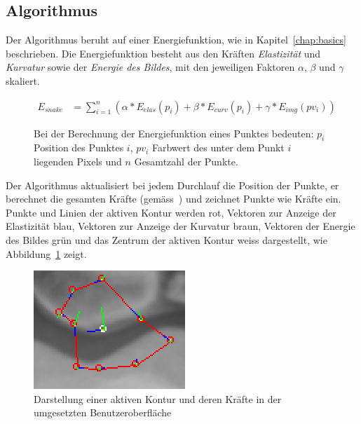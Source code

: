 \subsection{Algorithmus}
\label{subsec:realization:algo}
Der Algorithmus beruht auf einer Energiefunktion, wie in Kapitel~\ref{chap:basics} beschrieben. Die Energiefunktion besteht aus den Kräften \textit{Elastizität} und \textit{Kurvatur} sowie der \textit{Energie des Bildes}, mit den jeweiligen Faktoren \textit{$\alpha$}, \textit{$\beta$} und \textit{$\gamma$} skaliert.

\begin{figure}[H]
    \renewcommand\figurename{Auflistung}
    \begin{align}
        E_{snake} & = \displaystyle\sum_{i=1}^{n}(\alpha * E_{elas}(p_i) + \beta * E_{curv}(p_i) + \gamma * E_{img}(pv_i))
    \end{align}
    \caption{Bei der Berechnung der Energiefunktion eines Punktes bedeuten: $p_i$ Position des Punktes $i$, $pv_i$ Farbwert des unter dem Punkt $i$ liegenden Pixels und $n$ Gesamtzahl der Punkte.\protect\footnotemark}
\end{figure}

Der Algorithmus aktualisiert bei jedem Durchlauf die Position der Punkte, er berechnet die gesamten Kräfte (gemäss~\cite[Seite 147 und 148]{hudritsch:script:cp}) und zeichnet Punkte wie Kräfte ein.\\
Punkte und Linien der aktiven Kontur werden rot, Vektoren zur Anzeige der Elastizität blau, Vektoren zur Anzeige der Kurvatur braun, Vektoren der Energie des Bildes grün und das Zentrum der aktiven Kontur weiss dargestellt, wie Abbildung~\ref{fig:ownimpl_forces} zeigt.
\setcounter{figure}{0}
\begin{figure}[h!]
    \centering
    \includegraphics[scale=1.0]{images/ownimpl_forces.png}
    \caption{Darstellung einer aktiven Kontur und deren Kräfte in der umgesetzten Benutzeroberfläche\protect\footnotemark{}}
\label{fig:ownimpl_forces}
\end{figure}

